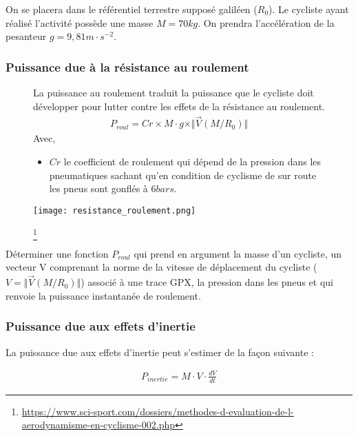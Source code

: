On se placera dans le référentiel terrestre supposé galiléen ($R_0$). Le cycliste ayant réalisé l'activité possède une masse $M=70kg$. On prendra l'accélération de la pesanteur $g=9,81m\cdot s^{-2}$.

\subsubsection{Puissance due à la résistance au roulement}

\begin{figure}[!htb]
\begin{minipage}{0.5\textwidth}
La puissance au roulement traduit la puissance que le cycliste doit développer pour lutter contre les effets de la résistance au roulement.
\begin{align*}
P_{roul}=Cr\times M\cdot g\times \Vert \overrightarrow{V}(M/R_0)\Vert
\end{align*}
Avec,
\begin{itemize}
\item $Cr$ le coefficient de roulement qui dépend de la pression dans les pneumatiques sachant qu'en condition de cyclisme de sur route les pneus sont gonflés à $6bars$.
\end{itemize}
\end{minipage}
\begin{minipage}{0.5\textwidth}
\begin{center}
\texttt{[image: resistance\_roulement.png]}
\caption{\label{res_roul}}
\footnote{\url{https://www.sci-sport.com/dossiers/methodes-d-evaluation-de-l-aerodynamisme-en-cyclisme-002.php}} 
\end{center}
\end{minipage}
\end{figure}

\question{} Déterminer une fonction $P_{roul}$ qui prend en argument la masse d'un cycliste, un vecteur V comprenant la norme de la vitesse de déplacement du cycliste ($V=\Vert \overrightarrow{V}(M/R_0)\Vert$) associé à une trace GPX, la pression dans les pneus et qui renvoie la puissance instantanée de roulement.

\subsubsection{Puissance due aux effets d'inertie}

La puissance due aux effets d'inertie peut s'estimer de la façon suivante : 

\begin{align*}
P_{inertie}=M\cdot V\cdot \frac{dV}{dt}
\end{align*}

